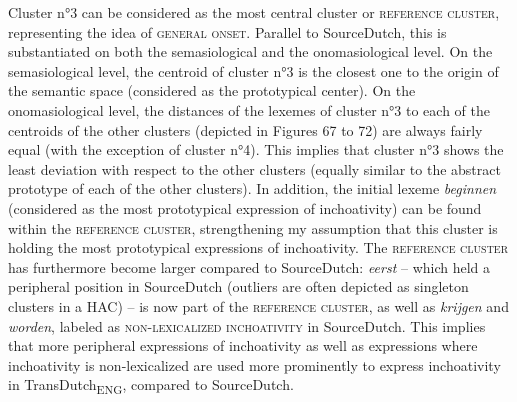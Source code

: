 Cluster n°3 can be considered as the most central cluster or \textsc{reference cluster}, representing the idea of \textsc{general onset}. Parallel to SourceDutch, this is substantiated on both the semasiological and the onomasiological level. On the semasiological level, the centroid of cluster n°3 is the closest one to the origin of the semantic space (considered as the prototypical center). On the onomasiological level, the distances of the lexemes of cluster n°3 to each of the centroids of the other clusters (depicted in Figures 67 to 72) are always fairly equal (with the exception of cluster n°4). This implies that cluster n°3 shows the least deviation with respect to the other clusters (equally similar to the abstract prototype of each of the other clusters). In addition, the initial lexeme \textit{beginnen} (considered as the most prototypical expression of inchoativity) can be found within the \textsc{reference cluster}, strengthening my assumption that this cluster is holding the most prototypical expressions of inchoativity. The \textsc{reference cluster} has furthermore become larger compared to SourceDutch: \textit{eerst} – which held a peripheral position in SourceDutch (outliers are often depicted as singleton clusters in a HAC) – is now part of the \textsc{reference cluster}, as well as \textit{krijgen} and \textit{worden}, labeled as {\textsc{non-lexicalized inchoativity}} in SourceDutch. This implies that more peripheral expressions of inchoativity as well as expressions where inchoativity is non-lexicalized are used more prominently to express inchoativity in TransDutch\textsubscript{ENG}, compared to SourceDutch.

